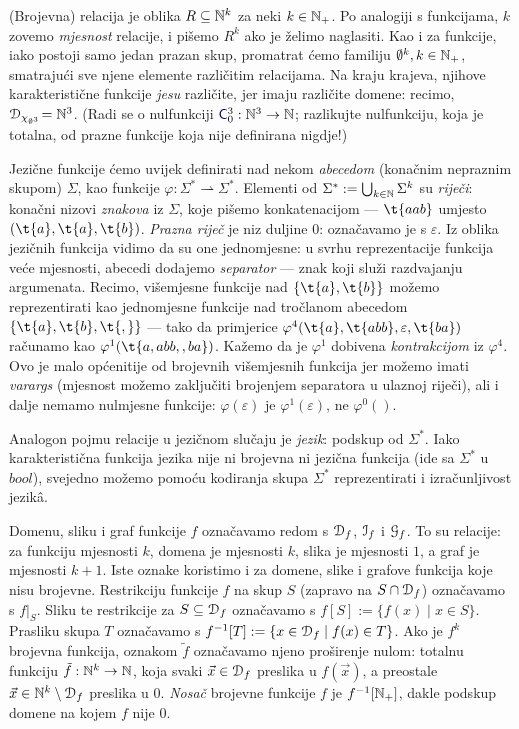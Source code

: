(Brojevna) relacija je oblika $R\subseteq{\mathbb N}^k$ za neki $k\in{\mathbb N}_+$. Po analogiji s funkcijama, $k$ zovemo \emph{mjesnost} relacije, i pišemo $R^k$ ako je želimo naglasiti. Kao i za funkcije, iako postoji samo jedan prazan skup, promatrat ćemo familiju $\emptyset^k,k\in{\mathbb N}_+$, smatrajući sve njene elemente različitim relacijama. Na kraju krajeva, njihove karakteristične funkcije \emph{jesu} različite, jer imaju različite domene: recimo, $\mathcal D_{\chi_{\emptyset^3}}\!={\mathbb N}^3$. (Radi se o nulfunkciji $\f C_0^3:\N^3\to\N$; razlikujte nulfunkciju, koja je totalna, od prazne funkcije koja nije definirana nigdje!)

Jezične funkcije ćemo uvijek definirati nad nekom \emph{abecedom} (konačnim nepraznim skupom) $\Sigma$, kao funkcije $\varphi:\Sigma^*\rightharpoonup\Sigma^*$. Elementi od $\Sigma^*:=\bigcup_{k\in{\mathbb N}}\Sigma^k$ su \emph{riječi}: konačni nizovi \emph{znakova} iz $\Sigma$, koje pišemo konkatenacijom --- $\t{aab}$ umjesto $(\t{a},\t{a},\t{b})$. \emph{Prazna riječ} je niz duljine $0$: označavamo je s $\varepsilon$. Iz oblika jezičnih funkcija vidimo da su one jednomjesne: u svrhu reprezentacije funkcija veće mjesnosti, abecedi dodajemo \emph{separator} --- znak koji služi razdvajanju argumenata. Recimo, višemjesne funkcije nad $\{\t{a},\t{b}\}$ možemo reprezentirati kao jednomjesne funkcije nad tročlanom abecedom $\{\t{a},\t{b},\t{,}\}$ --- tako da primjerice $\varphi^4(\t{a},\t{abb},\varepsilon,\t{ba})$ računamo kao $\varphi^1(\t{a{},{}a{}b{}b{},{},{}b{}a})$. Kažemo da je $\varphi^1$ dobivena \emph{kontrakcijom} iz $\varphi^4$. Ovo je malo općenitije od brojevnih višemjesnih funkcija jer možemo imati \emph{varargs} (mjesnost možemo zaključiti brojenjem separatora u ulaznoj ri\-je\-či), ali i dalje nemamo nulmjesne funkcije: $\varphi(\varepsilon)$ je $\varphi^1(\varepsilon)$, ne $\varphi^0()$. %

Analogon pojmu relacije u jezičnom slučaju je \emph{jezik}: podskup od $\Sigma^*$. Iako karakteristična funkcija jezika nije ni brojevna ni jezična funkcija (ide sa $\Sigma^*$ u $bool$), svejedno možemo pomoću kodiranja skupa $\Sigma^*$ reprezentirati i izračunljivost jezikâ. %

Domenu, sliku i graf funkcije $f$ označavamo redom s $\mathcal D_{f}$, $\mathcal I_{f}$ i $\mathcal G_{f}$. To su relacije: za funkciju mjesnosti $k$, domena je mjesnosti $k$, slika je mjesnosti $1$, a graf je mjesnosti $k+1$. Iste oznake koristimo i za domene, slike i grafove funkcija koje nisu brojevne. Restrikciju funkcije $f$ na skup $S$ (zapravo na $S\cap\mathcal D_{f}$) označavamo s $f|_S$. Sliku te restrikcije za $S\subseteq\mathcal D_{f}$ označavamo s $f[S]:=\{f(x)\mid x\in S\}$. Prasliku skupa $T$ označavamo s $f^{-1}[T]:=\{x\in\mathcal D_{f}\mid f(x)\in T\}$. Ako je $f^k$ brojevna funkcija, oznakom $\tilde f$ označavamo njeno proširenje nulom: totalnu funkciju $\tilde{f}:{\mathbb N}^k\to{\mathbb N}$, koja svaki $\vec x\in\mathcal D_{f}$ preslika u $f(\vec x)$, a preostale $\vec x\in{\mathbb N}^k\setminus\mathcal D_{f}$ preslika u $0$. \emph{Nosač} brojevne funkcije $f$ je $f^{-1}[{\mathbb N}_+]$, dakle podskup domene na kojem $f$ nije $0$.

